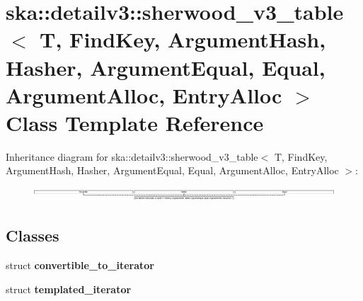 \section{ska\+:\+:detailv3\+:\+:sherwood\+\_\+v3\+\_\+table$<$ T, Find\+Key, Argument\+Hash, Hasher, Argument\+Equal, Equal, Argument\+Alloc, Entry\+Alloc $>$ Class Template Reference}
\label{classska_1_1detailv3_1_1sherwood__v3__table}
Inheritance diagram for ska\+:\+:detailv3\+:\+:sherwood\+\_\+v3\+\_\+table$<$ T, Find\+Key, Argument\+Hash, Hasher, Argument\+Equal, Equal, Argument\+Alloc, Entry\+Alloc $>$\+:\begin{figure}[H]
\begin{center}
\leavevmode
\includegraphics[height=0.512821cm]{classska_1_1detailv3_1_1sherwood__v3__table}
\end{center}
\end{figure}
\subsection*{Classes}
\begin{DoxyCompactItemize}
\item 
struct {\bf convertible\+\_\+to\+\_\+iterator}
\item 
struct {\bf templated\+\_\+iterator}
\end{DoxyCompactItemize}
